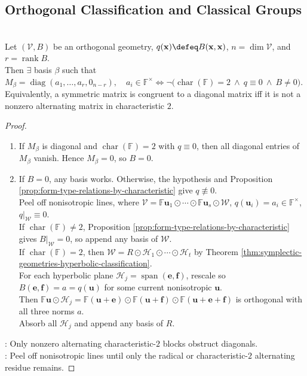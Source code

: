 \subsection{Orthogonal Classification and Classical Groups}

\begin{theorem} \label{thm:orthogonal-bases-and-diagonal-congruence} \\
Let $(\mathcal{V},B)$ be an orthogonal geometry, $q(\mathbf{x})\defeq B(\mathbf{x},\mathbf{x})$, $n=\dim\mathcal{V}$, and $r=\operatorname{rank}B$.\\
Then $\exists$ basis $\beta$ such that $M_{\beta}=\operatorname{diag}(a_1,\ldots,a_r,0_{n-r}),\quad a_i\in\mathbb{F}^{\times} \iff \neg\bigl(\operatorname{char}(\mathbb{F})=2\ \wedge\ q\equiv0\ \wedge\ B\neq0\bigr)$.\\
Equivalently, a symmetric matrix is congruent to a diagonal matrix iff it is not a nonzero alternating matrix in characteristic $2$.
\begin{proof}
\begin{enumerate}[label=\roman*.]
\setlength{\itemsep}{0pt}
\item[$(\Rightarrow)$] If $M_{\beta}$ is diagonal and $\operatorname{char}(\mathbb{F})=2$ with $q\equiv0$, then all diagonal entries of $M_{\beta}$ vanish. Hence $M_{\beta}=0$, so $B=0$.
\item[$(\Leftarrow)$] If $B=0$, any basis works. Otherwise, the hypothesis and Proposition \ref{prop:form-type-relations-by-characteristic} give $q\not\equiv0$.\\
Peel off nonisotropic lines, where $\mathcal{V} =\mathbb{F}\mathbf{u}_1\odot\cdots\odot\mathbb{F}\mathbf{u}_s\odot\mathcal{W}$, $q(\mathbf{u}_i)=a_i\in\mathbb{F}^{\times}$, $q|_{\mathcal{W}}\equiv0$.\\
If $\operatorname{char}(\mathbb{F})\neq2$, Proposition \ref{prop:form-type-relations-by-characteristic} gives $B|_{\mathcal{W}}=0$, so append any basis of $\mathcal{W}$.\\
If $\operatorname{char}(\mathbb{F})=2$, then $\mathcal{W}=R\odot\mathcal{H}_1\odot\cdots\odot\mathcal{H}_t$ by Theorem \ref{thm:symplectic-geometries-hyperbolic-classification}.\\
For each hyperbolic plane $\mathcal{H}_j=\operatorname{span}(\mathbf{e},\mathbf{f})$, rescale so $B(\mathbf{e},\mathbf{f})=a=q(\mathbf{u})$ for some current nonisotropic $\mathbf{u}$.\\
Then $\mathbb{F}\mathbf{u}\odot\mathcal{H}_j = \mathbb{F}(\mathbf{u}+\mathbf{e}) \odot \mathbb{F}(\mathbf{u}+\mathbf{f}) \odot \mathbb{F}(\mathbf{u}+\mathbf{e}+\mathbf{f})$ is orthogonal with all three norms $a$.\\
Absorb all $\mathcal{H}_j$ and append any basis of $R$.
\end{enumerate}
: Only nonzero alternating characteristic-$2$ blocks obstruct diagonals.\\
: Peel off nonisotropic lines until only the radical or characteristic-$2$ alternating residue remains.
\end{proof}
\end{theorem}

